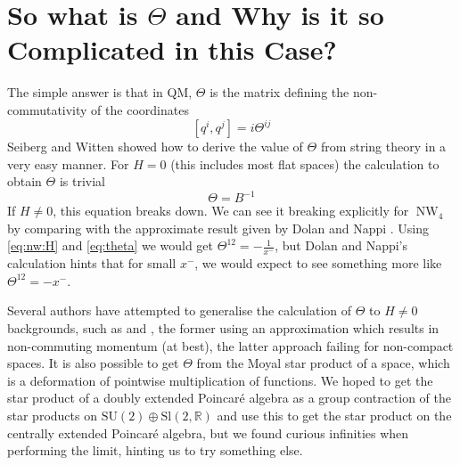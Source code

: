 \documentclass[11pt, a4paper, titlepage]{article}
\DeclareMathOperator{\NW}{NW}
\begin{document}
\section{So what is $\Theta$ and Why is it so Complicated in this Case?}
The simple answer is that in QM, $\Theta$ is the matrix defining the
non-commutativity of the coordinates
\begin{equation}
  \label{eq:theta}
  \left[q^i,q^j\right]=i\Theta^{ij}
\end{equation}
Seiberg and Witten \cite{stncg} showed how to derive the value of $\Theta$ from
string theory in a very easy manner. For $H=0$ (this includes most flat spaces)
the calculation to obtain $\Theta$ is trivial
\begin{equation}
  \label{eq:constantB}
  \Theta=B^{-1}
\end{equation}
If $H\neq 0$, this equation breaks down. We can see it breaking explicitly for
$\NW_4$ by comparing with the approximate result given by Dolan and Nappi
\cite{dn}. Using \eqref{eq:nw:H} and \eqref{eq:theta} we would get
$\Theta^{12}=-\frac{1}{x^-}$, but Dolan and Nappi's calculation hints that for
small $x^-$, we would expect to see something more like $\Theta^{12}=-x^-$.

Several authors have attempted to generalise the calculation of $\Theta$ to
$H\neq 0$ backgrounds, such as \cite{ho} and \cite{lbcb}, the former using an
approximation which results in non-commuting momentum (at best), the latter
approach failing for non-compact spaces. It is also possible to get $\Theta$
from the Moyal star product of a space, which is a deformation of pointwise
multiplication of functions. We hoped to get the star product of a doubly
extended Poincar\'{e} algebra as a group contraction of the star products on
$\mathrm{SU}(2)\oplus \mathrm{Sl}(2,\mathbb{R})$ and use this to get the star
product on the centrally extended Poincar\'{e} algebra, but we found curious
infinities when performing the limit, hinting us to try something else.
\end{document}
